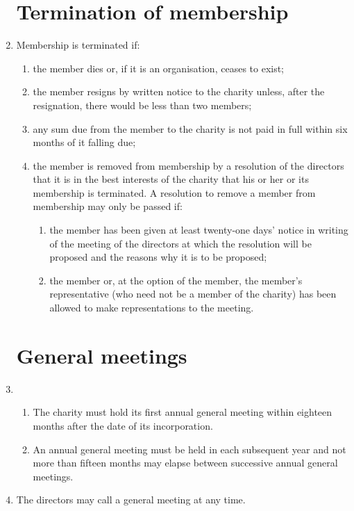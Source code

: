 \documentclass{article}
\begin{document}
\begin{enumerate}[label=\arabic*]
    \section{Termination of membership}
    \item Membership is terminated if:
    \begin{enumerate}[label=(\arabic*)]
        \item the member dies or, if it is an organisation, ceases to exist;
        \item the member resigns by written notice to the charity unless, after
        the resignation, there would be less than two members;
        \item any sum due from the member to the charity is not paid in full
        within six months of it falling due;
        \item the member is removed from membership by a resolution of
        the directors that it is in the best interests of the charity that his
        or her or its membership is terminated. A resolution to remove a
        member from membership may only be passed if:
        \begin{enumerate}[label=(\alph*)]
            \item the member has been given at least twenty-one days'
            notice in writing of the meeting of the directors at which
            the resolution will be proposed and the reasons why it is
            to be proposed;
            \item the member or, at the option of the member, the
            member's representative (who need not be a member of
            the charity) has been allowed to make representations to
            the meeting.
        \end{enumerate}
    \end{enumerate}
    
    \section{General meetings}
    \item \begin{enumerate}[label=(\arabic*)]
        \item The charity must hold its first annual general meeting within
        eighteen months after the date of its incorporation.
        \item An annual general meeting must be held in each subsequent
        year and not more than fifteen months may elapse between
        successive annual general meetings.
    \end{enumerate}
    \item The directors may call a general meeting at any time.
    

\end{enumerate}
\end{document}
